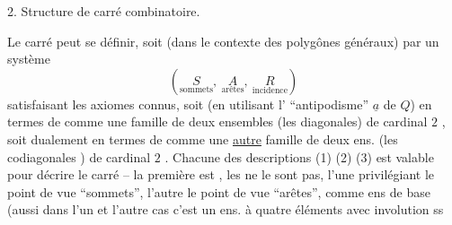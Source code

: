 2. Structure de carré combinatoire.

Le carré peut se définir, soit (dans le contexte des polygônes généraux) par un système
\[
(\underset{\text{sommets}}{S},\ \underset{\text{arêtes}}{A},\ \underset{\text{incidence}}{R})\tag*{(1)}
\]
satisfaisant les axiomes connus, soit (en utilisant l' ``antipodisme'' $\underline{a}$ de $Q$) en termes de
 comme une famille de deux ensembles (les diagonales) de cardinal $2$ , soit dualement  en termes de
comme une \uline{autre} famille de deux ens. (les codiagonales ) de cardinal $2$ . Chacune des descriptions (1) (2) (3) est valable pour décrire le carré -- la première est  , les   ne le sont pas, l'une privilégiant le point de vue ``sommets'', l'autre le point de vue ``arêtes'', comme ens de base (aussi dans l'un et l'autre cas c'est un ens. à quatre éléments avec involution ss 
